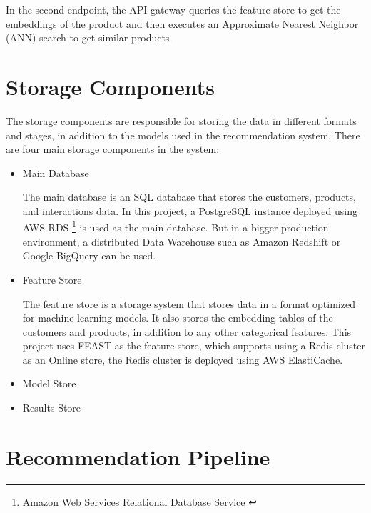 In the second endpoint, the API gateway queries the feature store to get the embeddings of the product and then executes an Approximate Nearest Neighbor (ANN) search to get similar products.

\section{Storage Components}

The storage components are responsible for storing the data in different formats and stages, in addition to the models used in the recommendation system.
There are four main storage components in the system:

\begin{itemize}
    \item Main Database
    \begin{displayquote}
        The main database is an SQL database that stores the customers, products, and
         interactions data. In this project, a PostgreSQL\cite{Postgres} instance 
         deployed using AWS RDS \footnote{Amazon Web Services Relational Database Service \cite{AwsRDS}}
         is used as the main database. 
         But in a bigger production environment, a distributed Data Warehouse such as 
         Amazon Redshift\cite{AwsRedshift} or Google BigQuery\cite{GoogleBigQuery} can be used.
    \end{displayquote}
    \item Feature Store
    \begin{displayquote}
        The feature store is a storage system that stores data in a format optimized for machine learning models.\cite{NvidiaFeatureStores}
        It also stores the embedding tables of the customers 
        and products, in addition to any other categorical features.
        This project uses FEAST \cite{feast} as the feature store, which supports using a Redis\cite{Redis} cluster as an Online store, the Redis cluster is deployed using AWS ElastiCache\cite{AwsElastiCache}.
    \end{displayquote}

    \item Model Store
    \item Results Store
\end{itemize}

\section{Recommendation Pipeline}


